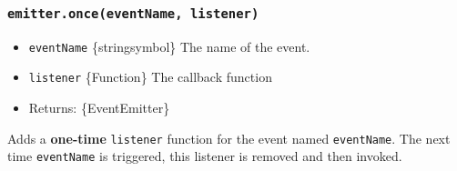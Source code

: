 \begin{Shaded}
\begin{Highlighting}[]
  \OperatorTok{=} \NormalTok{(}\NormalTok{)}\OperatorTok{;}
\OperatorTok{=}  \NormalTok{()}\OperatorTok{;}
\NormalTok{(}\OperatorTok{,}\NormalTok{ () }\KeywordTok{=\textgreater{}} \NormalTok{(}\NormalTok{))}\OperatorTok{;}
\NormalTok{(}\OperatorTok{,}\NormalTok{ () }\KeywordTok{=\textgreater{}} \NormalTok{(}\NormalTok{))}\OperatorTok{;}
\NormalTok{(}\NormalTok{)}\OperatorTok{;}
\end{Highlighting}
\end{Shaded}

\subsubsection{\texorpdfstring{\texttt{emitter.once(eventName,\ listener)}}{emitter.once(eventName, listener)}}\label{emitter.onceeventname-listener}

\begin{itemize}
\tightlist
\item
  \texttt{eventName} \{string\textbar symbol\} The name of the event.
\item
  \texttt{listener} \{Function\} The callback function
\item
  Returns: \{EventEmitter\}
\end{itemize}

Adds a \textbf{one-time} \texttt{listener} function for the event named
\texttt{eventName}. The next time \texttt{eventName} is triggered, this
listener is removed and then invoked.

\begin{Shaded}
\begin{Highlighting}[]
\NormalTok{(}\OperatorTok{,}\KeywordTok{=\textgreater{}}\NormalTok{ \{}
  \NormalTok{(}\NormalTok{)}\OperatorTok{;}
\NormalTok{\})}\OperatorTok{;}
\end{Highlighting}
\end{Shaded}

